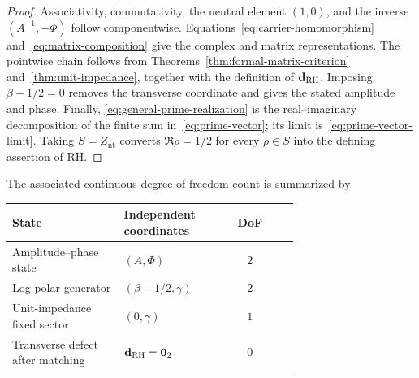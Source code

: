 \documentclass[11pt]{article}
\newcommand{\Znt}{Z_{\mathrm{nt}}}
\newcommand{\vzero}{\mathbf 0}
\begin{document}
\begin{proof}
Associativity, commutativity, the neutral element $(1,0)$, and the inverse
$(A^{-1},-\Phi)$ follow componentwise.  Equations~\eqref{eq:carrier-homomorphism}
and~\eqref{eq:matrix-composition} give the complex and matrix representations.  The
pointwise chain follows from Theorems~\ref{thm:formal-matrix-criterion}
and~\ref{thm:unit-impedance}, together with the definition of $\mathbf d_{\rm RH}$.
Imposing $\beta-1/2=0$ removes the transverse
coordinate and gives the stated amplitude and phase.  Finally,
\eqref{eq:general-prime-realization} is the real--imaginary decomposition of the finite sum
in~\eqref{eq:prime-vector}; its limit is~\eqref{eq:prime-vector-limit}.  Taking
$S=\Znt$ converts $\Re\rho=1/2$ for every $\rho\in S$ into the defining assertion of RH.
\end{proof}

The associated continuous degree-of-freedom count is summarized by
\begin{center}
\begin{tabular}{>{\raggedright\arraybackslash}p{0.39\linewidth}>{\raggedright\arraybackslash}p{0.31\linewidth}c}
\toprule
State & Independent coordinates & DoF\\
\midrule
Amplitude--phase state & $(A,\Phi)$ & $2$\\
Log-polar generator & $(\beta-1/2,\gamma)$ & $2$\\
Unit-impedance fixed sector & $(0,\gamma)$ & $1$\\
Transverse defect after matching & $\mathbf d_{\rm RH}=\vzero_2$ & $0$\\
\bottomrule
\end{tabular}
\end{center}
\end{document}

